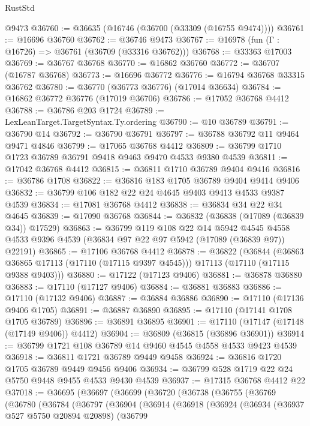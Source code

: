 \begin{lexlean}{RustStd}
\begin{coremodule}
    @9473
@36760 := @36635 (@16746 (@36700 (@33309 (@16755 @9474))))
@36761 := @16696 @36760
@36762 := @36746 @9473
@36767 := @16978 (fun (Γ : @16726) => @36761 (@36709 (@33316 @36762)))
@36768 := @33363 @17003
@36769 := @36767 @36768
@36770 := @16862 @36760
@36772 := @36707 (@16787 @36768)
@36773 := @16696 @36772
@36776 := @16794 @36768 @33315 @36762
@36780 := @36770 (@36773 @36776) (@17014 @36634)
@36784 := @16862 @36772 @36776 (@17019 @36706)
@36786 := @17052 @36768 @4412
@36788 := @36786 @203 @1724
@36789 := LexLeanTarget.TargetSyntax.Ty.ordering
@36790 := @10 @36789
@36791 := @36790 @14
@36792 := @36790 @36791
@36797 := @36788 @36792 @11 @9464 @9471 @4846
@36799 := @17065 @36768 @4412
@36809 := @36799 @1710 @1723 @36789 @36791 @9418 @9463 @9470 @4533 @9380 @4539
@36811 := @17042 @36768 @4412
@36815 := @36811 @1710 @36789 @9404 @9416
@36816 := @36786 @1708
@36822 := @36816 @183 @1705 @36789 @9404 @9414 @9406
@36832 := @36799 @106 @182 @22 @24 @4645 @9403 @9413 @4533 @9387 @4539
@36834 := @17081 @36768 @4412
@36838 := @36834 @34 @22 @34 @4645
@36839 := @17090 @36768
@36844 := @36832 (@36838 (@17089 (@36839 @34)) @17529)
@36863 := @36799
    @119
    @108
    @22
    @14
    @5942
    @4545
    @4558
    @4533
    @9396
    @4539
    (@36834 @97 @22 @97 @5942 (@17089 (@36839 @97)) @22191)
@36865 := @17106 @36768 @4412
@36878 := @36822
    (@36844
      (@36863 @36865 @17113 (@17110 (@17115 @9397 @4545)))
      @17113
      (@17110 (@17115 @9388 @9403)))
@36880 := @17122 (@17123 @9406)
@36881 := @36878 @36880
@36883 := @17110 (@17127 @9406)
@36884 := @36881 @36883
@36886 := @17110 (@17132 @9406)
@36887 := @36884 @36886
@36890 := @17110 (@17136 @9406 @1705)
@36891 := @36887 @36890
@36895 := @17110 (@17141 @1708 @1705 @36789)
@36896 := @36891 @36895
@36901 := @17110 (@17147 (@17148 (@17149 @9406)) @4412)
@36904 := @36809 (@36815 (@36896 @36901))
@36914 := @36799 @1721 @108 @36789 @14 @9460 @4545 @4558 @4533 @9423 @4539
@36918 := @36811 @1721 @36789 @9449 @9458
@36924 := @36816 @1720 @1705 @36789 @9449 @9456 @9406
@36934 := @36799 @528 @1719 @22 @24 @5750 @9448 @9455 @4533 @9430 @4539
@36937 := @17315 @36768 @4412 @22
@37018 := @36695
    (@36697
      (@36699
        (@36720
          (@36738
            (@36755
              (@36769
                (@36780
                  (@36784
                    (@36797
                      (@36904
                        (@36914
                          (@36918
                            (@36924
                              (@36934
                                (@36937 @527 @5750 @20894 @20898)
                                (@36799

\end{coremodule}
\end{lexlean}
